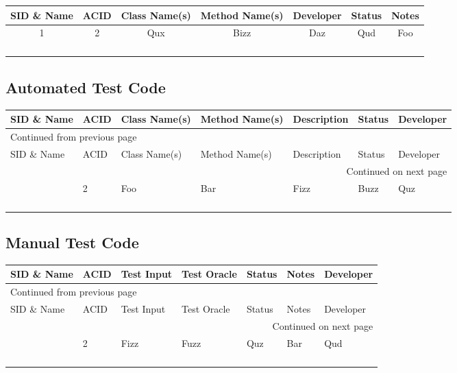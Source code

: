 \documentclass[11pt]{article}
\begin{document}
\begin{center}
\begin{tabular}{|c|c|c|c|c|c|c|}
SID \& Name & ACID & Class Name(s) & Method Name(s) & Developer & Status & Notes\\
\hline
1 & 2 & Qux & Bizz & Daz & Qud & Foo\\
 &  &  &  &  &  & \\
 &  &  &  &  &  & \\
 &  &  &  &  &  & \\
 &  &  &  &  &  & \\
\end{tabular}
\end{center}

\subsection{Automated Test Code}
\label{sec:orgcf9cf0c}


\begin{longtable}{|l|l|p{2.5cm}|p{2.5cm}|p{2.5cm}|l|l|}
SID \& Name & ACID & Class Name(s) & Method Name(s) & Description & Status & Developer\\
\hline
\endfirsthead
\multicolumn{7}{l}{Continued from previous page} \\
\hline

SID \& Name & ACID & Class Name(s) & Method Name(s) & Description & Status & Developer \\

\hline
\endhead
\hline\multicolumn{7}{r}{Continued on next page} \\
\endfoot
\endlastfoot
\hline
1 & 2 & Foo & Bar & Fizz & Buzz & Quz\\
 &  &  &  &  &  & \\
 &  &  &  &  &  & \\
 &  &  &  &  &  & \\
 &  &  &  &  &  & \\
\end{longtable}


\subsection{Manual Test Code}
\label{sec:orgc229bce}
\begin{longtable}{|l|l||p{2.5cm}|p{2.5cm}|l|l|l|}
SID \& Name & ACID & Test Input & Test Oracle & Status & Notes & Developer\\
\hline
\endfirsthead
\multicolumn{7}{l}{Continued from previous page} \\
\hline

SID \& Name & ACID & Test Input & Test Oracle & Status & Notes & Developer \\

\hline
\endhead
\hline\multicolumn{7}{r}{Continued on next page} \\
\endfoot
\endlastfoot
\hline
1 & 2 & Fizz & Fuzz & Quz & Bar & Qud\\
 &  &  &  &  &  & \\
 &  &  &  &  &  & \\
 &  &  &  &  &  & \\
 &  &  &  &  &  & \\
\end{longtable}
\end{document}

